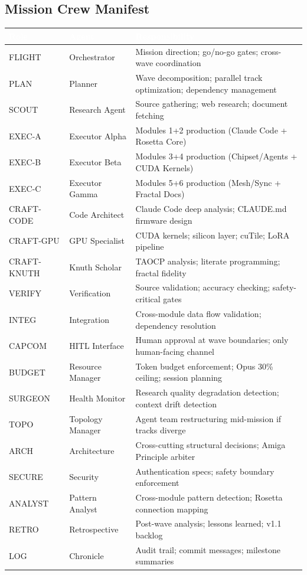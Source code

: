 \documentclass[11pt,letterpaper]{article}
\newcommand{\tableheader}[1]{\textbf{\sffamily\textcolor{white}{#1}}}
\begin{document}
\subsection{Mission Crew Manifest}

\begin{center}
\begin{tabularx}{\textwidth}{L{2.5cm}L{3cm}X}
\toprule
{}
\tableheader{Role} & \tableheader{Agent} & \tableheader{Responsibility} \\
\midrule
FLIGHT & Orchestrator & Mission direction; go/no-go gates; cross-wave coordination \\
PLAN & Planner & Wave decomposition; parallel track optimization; dependency management \\
SCOUT & Research Agent & Source gathering; web research; document fetching \\
EXEC-A & Executor Alpha & Modules 1+2 production (Claude Code + Rosetta Core) \\
EXEC-B & Executor Beta & Modules 3+4 production (Chipset/Agents + CUDA Kernels) \\
EXEC-C & Executor Gamma & Modules 5+6 production (Mesh/Sync + Fractal Docs) \\
CRAFT-CODE & Code Architect & Claude Code deep analysis; CLAUDE.md firmware design \\
CRAFT-GPU & GPU Specialist & CUDA kernels; silicon layer; cuTile; LoRA pipeline \\
CRAFT-KNUTH & Knuth Scholar & TAOCP analysis; literate programming; fractal fidelity \\
VERIFY & Verification & Source validation; accuracy checking; safety-critical gates \\
INTEG & Integration & Cross-module data flow validation; dependency resolution \\
CAPCOM & HITL Interface & Human approval at wave boundaries; only human-facing channel \\
BUDGET & Resource Manager & Token budget enforcement; Opus 30\% ceiling; session planning \\
SURGEON & Health Monitor & Research quality degradation detection; context drift detection \\
TOPO & Topology Manager & Agent team restructuring mid-mission if tracks diverge \\
ARCH & Architecture & Cross-cutting structural decisions; Amiga Principle arbiter \\
SECURE & Security & Authentication specs; safety boundary enforcement \\
ANALYST & Pattern Analyst & Cross-module pattern detection; Rosetta connection mapping \\
RETRO & Retrospective & Post-wave analysis; lessons learned; v1.1 backlog \\
LOG & Chronicle & Audit trail; commit messages; milestone summaries \\
\bottomrule
\end{tabularx}
\end{center}
\end{document}
